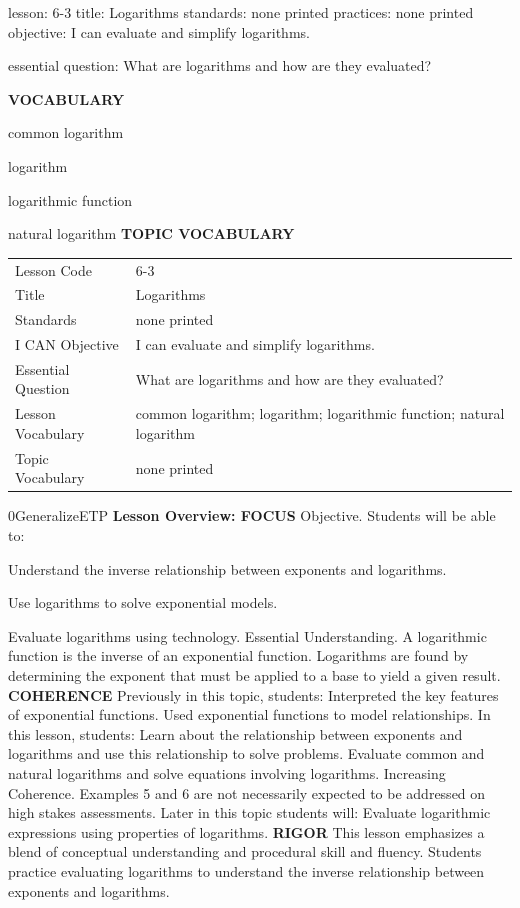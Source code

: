 \documentclass{article}
\newenvironment{lesson-meta}{}{}        %
\newenvironment{te-addendum}[2]{}{}     %
\newcommand{\te}[1]{}                   %
\begin{document}
\begin{lesson-meta}
lesson: 6-3
title: Logarithms
standards: none printed
practices: none printed
objective: I can evaluate and simplify logarithms.

essential question: What are logarithms and how are they evaluated?

\textbf{VOCABULARY}
\item common logarithm
\item logarithm
\item logarithmic function
\item natural logarithm
\textbf{TOPIC VOCABULARY}
\te{No separate topic vocabulary list is printed on these lesson pages.}
\begin{tabular}{ll}
Lesson Code & 6-3 \\
Title & Logarithms \\
Standards & none printed \\
I CAN Objective & I can evaluate and simplify logarithms. \\
Essential Question & What are logarithms and how are they evaluated? \\
Lesson Vocabulary & common logarithm; logarithm; logarithmic function; natural logarithm \\
Topic Vocabulary & none printed \\
\end{tabular}
\end{lesson-meta}
\begin{te-addendum}{0}{GeneralizeETP}
\textbf{Lesson Overview: FOCUS}
Objective. Students will be able to:
\item Understand the inverse relationship between exponents and logarithms.
\item Use logarithms to solve exponential models.
\item Evaluate logarithms using technology.
Essential Understanding. A logarithmic function is the inverse of an exponential function. Logarithms are found by determining the exponent that must be applied to a base to yield a given result.
\textbf{COHERENCE}
Previously in this topic, students: Interpreted the key features of exponential functions. Used exponential functions to model relationships.
In this lesson, students: Learn about the relationship between exponents and logarithms and use this relationship to solve problems. Evaluate common and natural logarithms and solve equations involving logarithms.
Increasing Coherence. Examples 5 and 6 are not necessarily expected to be addressed on high stakes assessments.
Later in this topic students will: Evaluate logarithmic expressions using properties of logarithms.
\textbf{RIGOR}
This lesson emphasizes a blend of conceptual understanding and procedural skill and fluency. Students practice evaluating logarithms to understand the inverse relationship between exponents and logarithms.
\end{te-addendum}
\end{document}
